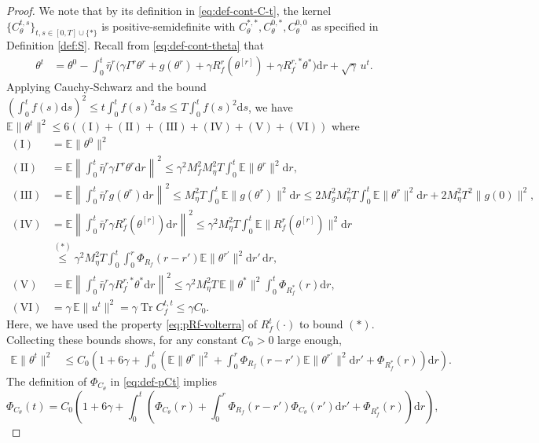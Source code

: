\documentclass[11pt,letterpaper,reqno]{amsart}
\theoremstyle{definition}
\def\d{\mathrm{d}}
\def\E{\mathbb{E}}
\def\Tr{\operatorname{Tr}}
\def\Ct{C_\theta}
\def\Cf{C_f}
\def\Rf{R_f}
\def\pCt{\Phi_{\Ct}}
\def\pRf{\Phi_{\Rf}}
\def\nI{(\mathrm{I})}
\def\nII{(\mathrm{II})}
\def\nIII{(\mathrm{III})}
\def\nIV{(\mathrm{IV})}
\def\nV{(\mathrm{V})}
\def\nVI{(\mathrm{VI})}
\newcommand{\norm}[1]{\|#1\|}
\begin{document}
\begin{proof}
We note that by its definition in \eqref{eq:def-cont-C-t},
the kernel
$\{C_\theta^{t,s}\}_{t,s \in [0,T] \cup \{*\}}$ is positive-semidefinite 
with $C_\theta^{*,*},C_\theta^{0,*},C_\theta^{0,0}$ as specified in Definition
\ref{def:S}. Recall from \eqref{eq:def-cont-theta} that
\begin{align}\label{eq:bound-theta-second-moment-1}
    \theta^t&=\theta^0-\int_0^t \bar\eta^r \Big({\gamma}\Gamma^r
\theta^r+g(\theta^r)+{\gamma}R_f^{r}(\theta^{[r]})+
{\gamma}R_f^{r,*}\theta^*\Big)\d r+\sqrt{\gamma}\,u^t.
\end{align}
Applying Cauchy-Schwarz and the bound $(\int_0^t f(s)\d s)^2 \leq t\int_0^t
f(s)^2 \d s \leq T\int_0^t f(s)^2 \d s$, we have $\E\|\theta^t\|^2 \leq
6(\nI+\nII+\nIII+\nIV+\nV+\nVI)$ where
\begin{align*}
\nI&=\E\|\theta^0\|^2\\
\nII&=\E\left\|\int_0^t
\bar\eta^r\gamma\Gamma^r\theta^r \d r\right\|^2
\leq \gamma^2 M_f^2 M_\eta^2 T\int_0^t \E\norm{\theta^r}^2 \d r,\\
\nIII&=\E\left\|\int_0^t \bar\eta^r g(\theta^r) \d
r\right\|^2\leq M_\eta^2 T\int_0^t \E\|g(\theta^r)\|^2 \d r
    \leq 2M_g^2 M_\eta^2 T\int_0^t \E\norm{\theta^r}^2\d r
+2M_\eta^2 T^2\norm{g(0)}^2,\,\\
\nIV&=\E\left\|\int_0^t \bar\eta^r\gamma
R_f^{r}(\theta^{[r]}) \d r\right\|^2 \leq \gamma^2 M_\eta^2 T\int_0^t \E\norm{R_f^{r}(\theta^{[r]})}^2 \d r\\
    &\overset{(*)}{\leq} \gamma^2 M_\eta^2 T\int_0^t
\int_0^r \pRf(r-r')\E \|\theta^{r'}\|^2\d r'\,\d r,\\
\nV&=\E\left\|\int_0^t \bar\eta^r \gamma R_f^{r,*}\theta^*
\d r\right\|^2
    \leq \gamma^2 M_\eta^2 T\,\E\norm{\theta^*}^2
\int_0^t \Phi_{R_f^*}(r)\d r,\\
\nVI&=\gamma\,\E\norm{u^t}^2=\gamma \Tr \Cf^{t,t} \leq \gamma C_0.
\end{align*}
Here, we have used the property \eqref{eq:pRf-volterra} of $R_f^t(\cdot)$
to bound $(*)$.
Collecting these bounds shows, for any constant $C_0>0$ large enough,
\begin{align*}
\E\|\theta^t\|^2&\leq C_0\left(1+6\gamma+\int_0^t \left(\E\|\theta^r\|^2
+\int_0^r \Phi_{R_f}(r-r')\E\|\theta^{r'}\|^2\d r'+\Phi_{R_f^*}(r) \right)\d
r\right).
\end{align*}
The definition of $\pCt$ in \eqref{eq:def-pCt} implies
\begin{equation}\label{eq:PhiCthetaexplicit}
\pCt(t)=C_0\left(1+6\gamma+\int_0^t \left(\pCt(r)
+\int_0^r \Phi_{R_f}(r-r')\pCt(r')\d r'+\Phi_{R_f^*}(r) \right)\d r\right),

\end{equation}
\end{proof}
\end{document}
